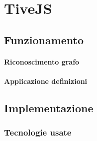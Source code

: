 \chapter{TiveJS}
    \section{Funzionamento}
        \subsubsection{Riconoscimento grafo}
        \subsubsection{Applicazione definizioni}
    \section{Implementazione}
        \subsection{Tecnologie usate}